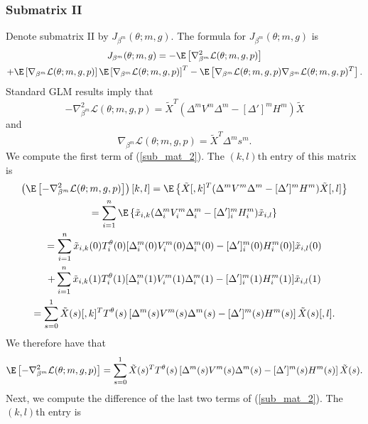 \documentclass[11pt]{article}
\begin{document}
\begin{appendices}
\begin{refsection}
\subsubsection*{Submatrix II}
Denote submatrix II by $J_{\beta^m}(\theta; m, g).$ The formula for $J_{\beta^m}(\theta; m, g)$ is
\begin{multline}\label{sub_mat_2}
J_{\beta^m}(\theta; m, g) = -\E \left[\nabla_{\beta^m}^2 \mathcal{L}(\theta; m, g, p) \right] \\ + \E\left[\nabla_{\beta^m} \mathcal{L}(\theta; m, g, p) \right] \E\left[ \nabla_{\beta^m} \mathcal{L}(\theta; m, g, p) \right]^T - \E\left[ \nabla_{\beta^m} \mathcal{L}(\theta; m, g, p) \nabla_{\beta^m} \mathcal{L}(\theta; m, g, p)^T  \right].
\end{multline}
Standard GLM results imply that
$$ -\nabla_{\beta^m}^2 \mathcal{L}(\theta; m, g, p) = \tilde{X}^T ( \Delta^m V^m \Delta^m - [\Delta']^m H^m ) \tilde{X}$$ and $$\nabla_{\beta^m}\mathcal{L}(\theta; m, g, p) = \tilde{X}^T \Delta^m s^m.$$
We compute the first term of (\ref{sub_mat_2}). The $(k,l)$th entry of this matrix is
\begin{multline*}
\left( \E\left[-\nabla_{\beta^m}^2 \mathcal{L}(\theta; m, g, p)\right]\right)[k,l] = \E \left\{\tilde{X}[,k]^T (\Delta^m V^m \Delta^m - [\Delta']^mH^m) \tilde{X}[,l] \right\} \\ = \sum_{i=1}^n \E \left\{ \tilde{x}_{i,k} (\Delta^m_{i} V^m_{i} \Delta^m_{i} - [\Delta']^m_{i} H^m_{i}) \tilde{x}_{i,l} \right\} \\ = \sum_{i=1}^n \tilde{x}_{i,k}(0) T_i^{\theta}(0) [{\Delta}^m_i(0)  {V}^m_i(0) {\Delta}^m_i(0) - [\Delta']^m_i(0) {H}^m_i(0)] \tilde{x}_{i,l}(0) \\ + \sum_{i=1}^n \tilde{x}_{i,k}(1) T_i^{\theta}(1) [ {\Delta}^m_i(1)  {V}^m_i(1) {\Delta}^m_i(1) - [{\Delta}']^m_i(1) {H}^m_i(1)] \tilde{x}_{i,l}(1) \\ = \sum_{s = 0}^1 \tilde{X}(s)[,k]^T {T}^{\theta}(s) \left[ {\Delta}^m(s) {V}^m(s) {\Delta}^m(s) - [{\Delta}']^m(s) {H}^m(s) \right] \tilde{X}(s)[,l].
\end{multline*}
We therefore have that
\begin{multline}\label{sub_mat_2_1}
\E\left[-\nabla_{\beta^m}^2 \mathcal{L}(\theta; m, g, p)\right] = \sum_{s=0}^1 \tilde{X}(s)^T T^{\theta}(s) \left[ {\Delta}^m(s) {V}^m(s) {\Delta}^m(s) - [{\Delta}']^m(s) {H}^m(s) \right] \tilde{X}(s).
\end{multline}
Next, we compute the difference of the last two terms of (\ref{sub_mat_2}). The $(k,l)$th entry is

\end{refsection}
\end{appendices}
\end{document}
